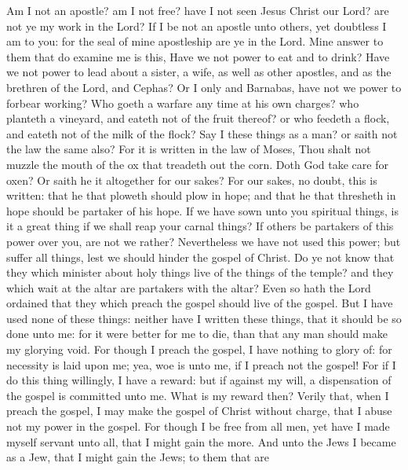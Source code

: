  Am I not an apostle? am I not free? have I not seen Jesus
Christ our Lord? are not ye my work in the Lord?  If I be
not an apostle unto others, yet doubtless I am to you: for the seal of
mine apostleship are ye in the Lord.  Mine answer to them
that do examine me is this,  Have we not power to eat and to
drink?  Have we not power to lead about a sister, a wife, as
well as other apostles, and as the brethren of the Lord, and Cephas?
 Or I only and Barnabas, have not we power to forbear
working?  Who goeth a warfare any time at his own charges?
who planteth a vineyard, and eateth not of the fruit thereof? or who
feedeth a flock, and eateth not of the milk of the flock? 
Say I these things as a man? or saith not the law the same also?
 For it is written in the law of Moses, Thou shalt not
muzzle the mouth of the ox that treadeth out the corn. Doth God take
care for oxen?  Or saith he it altogether for our sakes?
For our sakes, no doubt, this is written: that he that ploweth should
plow in hope; and that he that thresheth in hope should be partaker of
his hope.  If we have sown unto you spiritual things, is it
a great thing if we shall reap your carnal things?  If
others be partakers of this power over you, are not we rather?
Nevertheless we have not used this power; but suffer all things, lest we
should hinder the gospel of Christ.  Do ye not know that
they which minister about holy things live of the things of the temple?
and they which wait at the altar are partakers with the altar?
 Even so hath the Lord ordained that they which preach the
gospel should live of the gospel.  But I have used none of
these things: neither have I written these things, that it should be so
done unto me: for it were better for me to die, than that any man should
make my glorying void.  For though I preach the gospel, I
have nothing to glory of: for necessity is laid upon me; yea, woe is
unto me, if I preach not the gospel!  For if I do this
thing willingly, I have a reward: but if against my will, a dispensation
of the gospel is committed unto me.  What is my reward
then? Verily that, when I preach the gospel, I may make the gospel of
Christ without charge, that I abuse not my power in the gospel.
 For though I be free from all men, yet have I made myself
servant unto all, that I might gain the more.  And unto the
Jews I became as a Jew, that I might gain the Jews; to them that are
